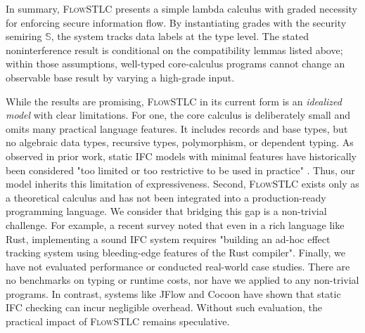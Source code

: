 \documentclass[conference]{IEEEtran}
\newcommand\secure{\mathbb{S}}
\begin{document}
In summary, \textsc{FlowSTLC} presents a simple lambda calculus with graded necessity for enforcing secure information flow. By instantiating grades with the security semiring $\secure$, the system tracks data labels at the type level. The stated noninterference result is conditional on the compatibility lemmas listed above; within those assumptions, well-typed core-calculus programs cannot change an observable base result by varying a high-grade input.

While the results are promising, \textsc{FlowSTLC} in its current form is an \emph{idealized model} with clear limitations. For one, the core calculus is deliberately small and omits many practical language features. It includes records and base types, but no algebraic data types, recursive types, polymorphism, or dependent typing. As observed in prior work, static IFC models with minimal features have historically been considered "too limited or too restrictive to be used in practice" \cite{myers1999jflow}. Thus, our model inherits this limitation of expressiveness. Second, \textsc{FlowSTLC} exists only as a theoretical calculus and has not been integrated into a production-ready programming language. We consider that bridging this gap is a non-trivial challenge. For example, a recent survey noted that even in a rich language like Rust, implementing a sound IFC system requires "building an ad-hoc effect tracking system using bleeding-edge features of the Rust compiler". Finally, we have not evaluated performance or conducted real-world case studies. There are no benchmarks on typing or runtime costs, nor have we applied  to any non-trivial programs. In contrast, systems like JFlow and Cocoon \cite{lamba2024cocoon} have shown that static IFC checking can incur negligible overhead. Without such evaluation, the practical impact of \textsc{FlowSTLC} remains speculative.
\end{document}
